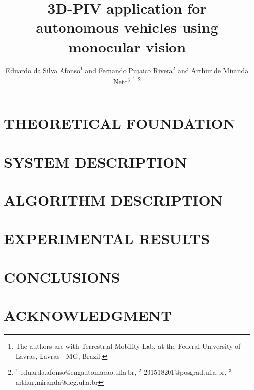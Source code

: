 \documentclass[letterpaper, 10 pt,conference]{ieeeconf}  %
\title{\LARGE \bf
3D-PIV application for autonomous vehicles using monocular vision
}
\author{Eduardo da Silva Afonso$^{1}$ and Fernando Pujaico Rivera$^{2}$ and Arthur de Miranda Neto$^{3}$%
\thanks{The authors are with Terrestrial Mobility Lab. at the Federal University of Lavras, Lavras - MG, Brazil.}%
\thanks{$^{1}$  eduardo.afonso@engautomacao.ufla.br, $^{2}$  201518201@posgrad.ufla.br, $^{3}$  arthur.miranda@deg.ufla.br}%
}
\begin{document}
\maketitle
\thispagestyle{empty}
\pagestyle{empty}

\begin{abstract}



\end{abstract}



\section{THEORETICAL FOUNDATION}




\section{SYSTEM DESCRIPTION}


\section{ALGORITHM DESCRIPTION}
 




\section{EXPERIMENTAL RESULTS}


\section{CONCLUSIONS}

\addtolength{\textheight}{-12cm}

\section*{ACKNOWLEDGMENT}



\end{document}
